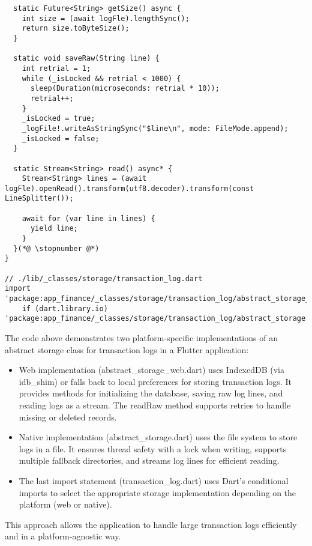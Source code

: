 \begin{lstlisting}
  static Future<String> getSize() async {
    int size = (await logFle).lengthSync();
    return size.toByteSize();
  }

  static void saveRaw(String line) {
    int retrial = 1;
    while (_isLocked && retrial < 1000) {
      sleep(Duration(microseconds: retrial * 10));
      retrial++;
    }
    _isLocked = true;
    _logFile!.writeAsStringSync("$line\n", mode: FileMode.append);
    _isLocked = false;
  }

  static Stream<String> read() async* {
    Stream<String> lines = (await logFle).openRead().transform(utf8.decoder).transform(const LineSplitter());

    await for (var line in lines) {
      yield line;
    }
  }(*@ \stopnumber @*)
}

// ./lib/_classes/storage/transaction_log.dart
import 'package:app_finance/_classes/storage/transaction_log/abstract_storage_web.dart'
    if (dart.library.io) 'package:app_finance/_classes/storage/transaction_log/abstract_storage.dart';
\end{lstlisting}

\noindent The code above demonstrates two platform-specific implementations of an abstract storage class for transaction 
logs in a Flutter application:

\begin{itemize}
\setlength{\itemsep}{3pt}
\setlength{\parskip}{0pt}
\setlength{\parsep}{0pt}
    \item Web implementation (abstract\_storage_web.dart) uses IndexedDB (via idb\_shim) or falls back to local 
    preferences for storing transaction logs. It provides methods for initializing the database, saving raw log lines, 
    and reading logs as a stream. The readRaw method supports retries to handle missing or deleted records.

    \item Native implementation (abstract\_storage.dart) uses the file system to store logs in a file. It ensures thread 
    safety with a lock when writing, supports multiple fallback directories, and streams log lines for efficient reading.

    \item The last import statement (transaction\_log.dart) uses Dart's conditional imports to select the appropriate 
    storage implementation depending on the platform (web or native).
\end{itemize}

\noindent This approach allows the application to handle large transaction logs efficiently and in a platform-agnostic 
way.


